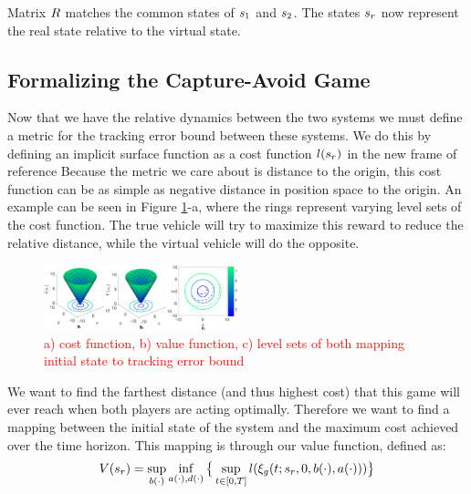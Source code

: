 Matrix $R$ matches the common states of $s_1$ and $s_2$. The states $s_r$ now represent the real state relative to the virtual state.

\subsection{Formalizing the Capture-Avoid Game}
Now that we have the relative dynamics between the two systems we must define a metric for the tracking error bound between these systems. We do this by defining an implicit surface function as a cost function $l(s_r)$ in the new frame of reference  Because the metric we care about is distance to the origin, this cost function can be as simple as negative distance in position space to the origin. An example can be seen in Figure \ref{fig:quad4D_example}-a, where the rings represent varying level sets of the cost function. The true vehicle will try to maximize this reward to reduce the relative distance, while the virtual vehicle will do the opposite.

\begin{figure}
	\centering
	\includegraphics[width=0.5\textwidth]{fig/quad4D_example}
	\caption{\textcolor{red}{a) cost function, b) value function, c) level sets of both mapping initial state to tracking error bound}}
	\label{fig:quad4D_example}
\end{figure} 
 
 We want to find the farthest distance (and thus highest cost) that this game will ever reach when both players are acting optimally. Therefore we want to find a mapping between the initial state of the system and the maximum cost achieved over the time horizon. This mapping is through our value function, defined as: 
 \begin{equation}
 \begin{aligned}
 	V(s_r)= \sup_{b(\cdot)} \inf_{a(\cdot), d(\cdot)} \big\{\sup_{t\in [0, T]} l(\xi_g(t; s_r, 0, b(\cdot), a(\cdot)))\big\}
 	\end{aligned}
 \end{equation} 
 

